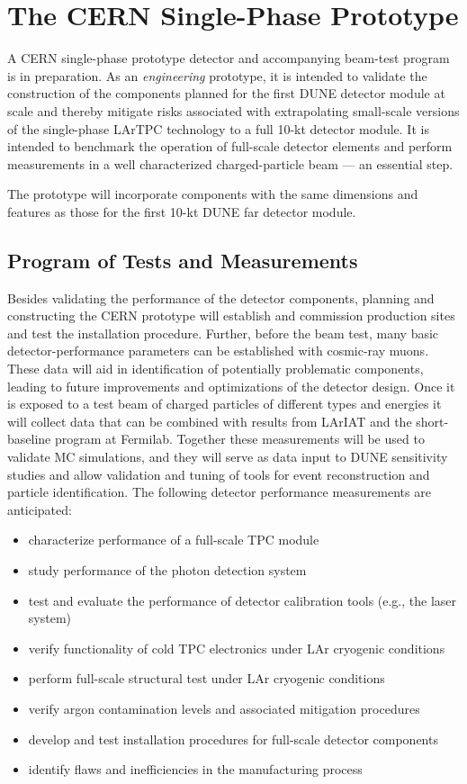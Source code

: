 \section{The CERN Single-Phase Prototype}
\label{sec:proto-cern-single}

A CERN single-phase prototype detector and accompanying beam-test
program is in preparation. As an \textit{engineering} prototype, it is
intended to validate the construction of the components planned for the
first DUNE  detector module at scale and thereby mitigate
risks associated with extrapolating small-scale versions of the
single-phase LArTPC technology to a full 10-kt detector module.  It is
intended to benchmark the operation of full-scale detector
elements and perform measurements in a well characterized
charged-particle beam --- an essential step.

The prototype will incorporate components with the same
dimensions and features as those for the first 10-kt DUNE far detector
module.

\subsection{Program of Tests and Measurements}

Besides validating the performance of the detector components,
planning and constructing the CERN prototype will establish and
commission production sites and test the installation procedure.
Further, before the beam test, many basic detector-performance
parameters can be established with cosmic-ray muons.  These data will
aid in identification of potentially problematic components, leading
to future improvements and optimizations of the detector design.  Once
it is exposed to a test beam of charged particles of different types
and energies it will collect data that can be combined with results
from LArIAT and the short-baseline program at Fermilab.  Together
these measurements will be used to validate MC simulations, and they
will serve as data input to DUNE sensitivity studies and allow
validation and tuning of tools for event reconstruction and particle
identification.  The following detector performance measurements are
anticipated:
 \begin{itemize}
 \item characterize performance of a full-scale TPC module
 \item study performance of the photon detection system
 \item test and evaluate the performance of detector calibration tools (e.g., the laser system)
  \item verify functionality of cold TPC electronics under LAr cryogenic conditions
  \item perform full-scale structural test under LAr cryogenic conditions
  \item verify argon contamination levels and associated mitigation procedures
  \item develop and test installation procedures for full-scale detector components
  \item identify flaws and inefficiencies in the manufacturing process
\end{itemize}


